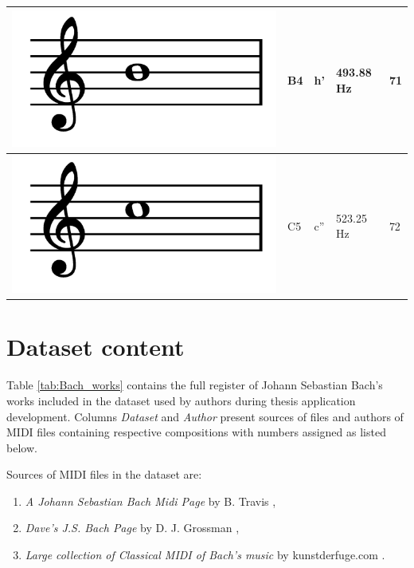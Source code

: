 \documentclass[a4paper, 11pt, twoside]{report}
\renewcommand*{\thetable}{\arabic{chapter}.\arabic{table}}
\theoremstyle{definition}
\begin{document}
\begin{longtable}{ | M{3.5cm} | M{2.8cm} | M{2.8cm} | M{2.5cm} | M{2.2cm} | }
    \includegraphics[width=0.85\linewidth]{assets/notes/B4.png}  & B4                      & h'                     & 493.88 Hz          & 71               \\ \hline \hline
    \includegraphics[width=0.85\linewidth]{assets/notes/C5.png}  & C5                      & c''                    & 523.25 Hz          & 72               \\ \hline
\end{longtable}

\newpage

\chapter{Dataset content} \label{app:dataset}
\setcounter{table}{0}
\renewcommand{\thetable}{C.\arabic{table}}

Table \ref{tab:Bach_works} contains the full register of Johann Sebastian Bach's works included in the dataset used by authors during thesis application development. Columns \textit{Dataset} and \textit{Author} present sources of files and authors of MIDI files containing respective compositions with numbers assigned as listed below. \par

\vfill

Sources of MIDI files in the dataset are:

\begin{enumerate}
    \item \textit{A Johann Sebastian Bach Midi Page} by B. Travis \cite{MIDI_central},
    \item \textit{Dave's J.S. Bach Page} by D. J. Grossman \cite{MIDI_Dave},
    \item \textit{Large collection of Classical MIDI of Bach's music} by kunstderfuge.com \cite{MIDI_kunst}.
\end{enumerate} \par
\end{document}
